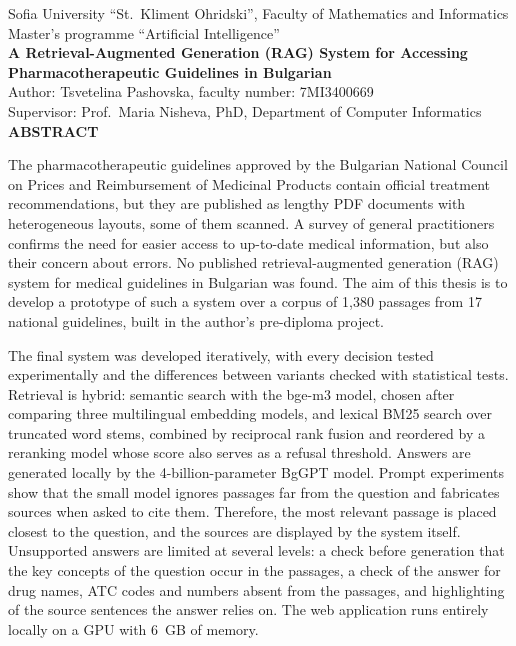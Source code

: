 \documentclass[12pt,a4paper]{article}
\begin{document}
\begin{center}
{\small Sofia University ``St.\ Kliment Ohridski'', Faculty of Mathematics and Informatics\\
Master's programme ``Artificial Intelligence''}\\[0.8em]
{\large\bfseries A Retrieval-Augmented Generation (RAG) System for Accessing\\ Pharmacotherapeutic Guidelines in Bulgarian}\\[0.6em]
Author: Tsvetelina Pashovska, faculty number: 7MI3400669\\[0.8em]
Supervisor: Prof.\ Maria Nisheva, PhD, Department of Computer Informatics\\[0.8em]
{\bfseries ABSTRACT}
\end{center}

The pharmacotherapeutic guidelines approved by the Bulgarian National Council on Prices and Reimbursement of Medicinal Products contain official treatment recommendations, but they are published as lengthy PDF documents with heterogeneous layouts, some of them scanned. A survey of general practitioners confirms the need for easier access to up-to-date medical information, but also their concern about errors. No published retrieval-augmented generation (RAG) system for medical guidelines in Bulgarian was found. The aim of this thesis is to develop a prototype of such a system over a corpus of 1,380 passages from 17 national guidelines, built in the author's pre-diploma project.

The final system was developed iteratively, with every decision tested experimentally and the differences between variants checked with statistical tests. Retrieval is hybrid: semantic search with the bge-m3 model, chosen after comparing three multilingual embedding models, and lexical BM25 search over truncated word stems, combined by reciprocal rank fusion and reordered by a reranking model whose score also serves as a refusal threshold. Answers are generated locally by the 4-billion-parameter BgGPT model. Prompt experiments show that the small model ignores passages far from the question and fabricates sources when asked to cite them. Therefore, the most relevant passage is placed closest to the question, and the sources are displayed by the system itself. Unsupported answers are limited at several levels: a check before generation that the key concepts of the question occur in the passages, a check of the answer for drug names, ATC codes and numbers absent from the passages, and highlighting of the source sentences the answer relies on. The web application runs entirely locally on a GPU with 6~GB of memory.
\end{document}
